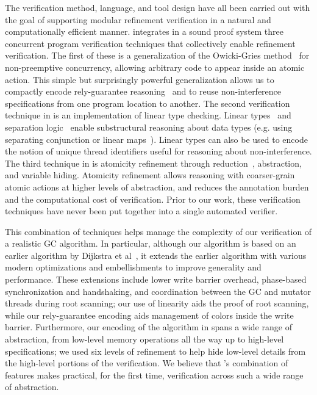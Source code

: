 The verification method, language, and tool design have all been carried out with the goal of supporting  modular refinement 
verification in a natural and computationally efficient manner. 
\civl integrates in a sound proof system three concurrent program verification techniques that collectively enable refinement verification. 
The first of these is a generalization of the Owicki-Gries method~\cite{OwickiG76} for non-preemptive concurrency, 
allowing arbitrary code to appear inside an atomic action. 
This simple but surprisingly powerful generalization allows us to compactly encode rely-guarantee reasoning~\cite{Jones83}
and to reuse non-interference specifications from one program location to another.
The second verification technique in \civl is an implementation of linear type checking.
Linear types~\cite{Wadler90lineartypes} and separation logic~\cite{Reynolds02} enable substructural reasoning about data types
(e.g. using separating conjunction or linear maps~\cite{LahiriQW11}).
Linear types can also be used to encode the notion of unique thread identifiers useful for reasoning about non-interference. 
The third technique in \civl is atomicity refinement through reduction~\cite{Lipton75}, abstraction, and variable hiding. 
Atomicity refinement allows reasoning with coarser-grain atomic actions at higher levels of abstraction, 
and reduces the annotation burden and the computational cost of verification. 
Prior to our work, these verification techniques have never been put together into a single automated verifier.

This combination of techniques helps manage the complexity of our verification of a realistic GC algorithm.  
In particular, although our algorithm is based on an earlier algorithm by Dijkstra et al~\cite{dijk78}, 
it extends the earlier algorithm with various modern optimizations and embellishments to improve generality and performance.  
These extensions include lower write barrier overhead, phase-based synchronization and handshaking, 
and coordination between the GC and mutator threads during root scanning; our use of linearity aids the proof of root scanning, 
while our rely-guarantee encoding aids management of colors inside the write barrier.  
Furthermore, our encoding of the algorithm in \civl spans a wide range of abstraction, 
from low-level memory operations all the way up to high-level specifications; 
we used six levels of refinement to help hide low-level details from the high-level portions of the verification.
We believe that \civl's combination of features makes practical, for the first time, verification across such a wide range of abstraction.

